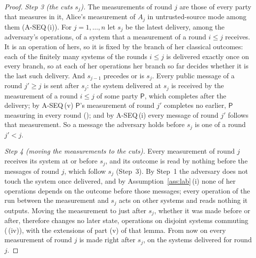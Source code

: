 \begin{proof}
\emph{Step 3 (the cuts $s_j$).} The measurements of round $j$ are those of
every party that measures in it, Alice's measurement of $A_j$ in
untrusted-source mode among them (A-SEQ\,(i)). For $j=1,\dots,n$ let $s_j$ be
the latest delivery, among the adversary's operations, of a system that a
measurement of a round $i\le j$ receives. It is an operation of hers, so it is
fixed by the branch of her classical outcomes: each of the finitely many
systems of the rounds $i\le j$ is delivered exactly once on every branch, so
at each of her operations her branch so far decides whether it is the last
such delivery. And $s_{j-1}$ precedes or is $s_j$. Every public message of a round $j'\ge j$ is sent after $s_j$: the
system delivered at $s_j$ is received by the measurement of a round $i\le j$
of some party $\mathsf P$, which completes after the delivery; by A-SEQ\,(v)
$\mathsf P$'s measurement of round $j'$ completes no earlier, $\mathsf P$
measuring in every round (); and by
A-SEQ\,(i) every message of round $j'$ follows that measurement. So a message
the adversary holds before $s_j$ is one of a round $j'<j$.

\emph{Step 4 (moving the measurements to the cuts).} Every measurement of
round $j$ receives its system at or before $s_j$, and its outcome is read by
nothing before the messages of round $j$, which follow $s_j$ (Step~3). By
Step~1 the adversary does not touch the system once delivered, and by
Assumption~\ref{ass:lab}\,(i) none of her operations depends on the outcome
before those messages; every operation of the run between the measurement and
$s_j$ acts on other systems and reads nothing it outputs. Moving the
measurement to just after $s_j$, whether it was made before or after,
therefore changes no later state, operations on disjoint systems commuting
(\,(iv)), with the extensions of
part (v) of that lemma. From now on every measurement of round $j$ is made
right after $s_j$, on the systems delivered for round $j$.


\end{proof}
